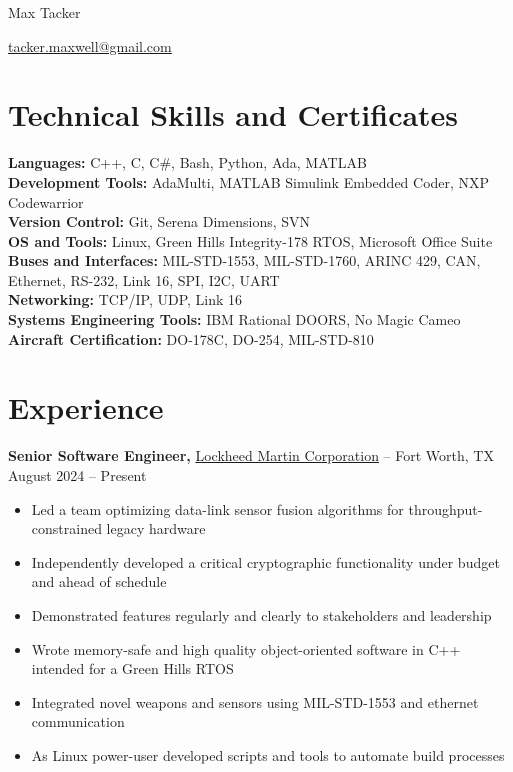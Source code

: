 \documentclass[11pt]{article}       %
\begin{document}
\centerline{\Huge Max Tacker}

\vspace{5pt}

\centerline{\href{mailto:tacker.maxwell@gmail.com}{tacker.maxwell@gmail.com} }

\vspace{-10pt}

\section*{Technical Skills and Certificates}
\textbf{Languages:} C++, C, C\#, Bash, Python, Ada, MATLAB\\
\textbf{Development Tools:} AdaMulti, MATLAB Simulink Embedded Coder, NXP Codewarrior\\
\textbf{Version Control:} Git, Serena Dimensions, SVN\\
\textbf{OS and Tools:} Linux, Green Hills Integrity-178 RTOS, Microsoft Office Suite \\
\textbf{Buses and Interfaces:} MIL-STD-1553, MIL-STD-1760, ARINC 429, CAN, Ethernet, RS-232, Link 16, SPI, I2C, UART\\
\textbf{Networking:} TCP/IP, UDP, Link 16\\
\textbf{Systems Engineering Tools:} IBM Rational DOORS, No Magic Cameo\\
\textbf{Aircraft Certification:} DO-178C, DO-254, MIL-STD-810\\

\vspace{-6.5pt}

\section*{Experience}
\textbf{Senior Software Engineer,} \href{https://www.lockheedmartin.com/}{Lockheed Martin Corporation} -- Fort Worth, TX \hfill August 2024 -- Present \\
\vspace{-9pt}
\begin{itemize}
  \item Led a team optimizing data-link sensor fusion algorithms for throughput-constrained legacy hardware
  \item Independently developed a critical cryptographic functionality under budget and ahead of schedule
  \item Demonstrated features regularly and clearly to stakeholders and leadership
  \item Wrote memory-safe and high quality object-oriented software in C++ intended for a Green Hills RTOS
  \item Integrated novel weapons and sensors using MIL-STD-1553 and ethernet communication
  \item As Linux power-user developed scripts and tools to automate build processes

\end{itemize}
\end{document}
